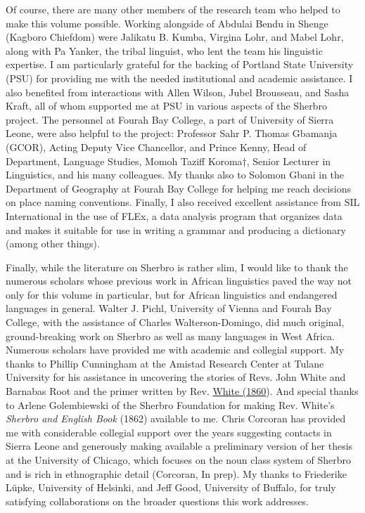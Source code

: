 Of course, there are many other members of the research team who helped to make this volume possible. Working alongside of Abdulai Bendu in Shenge (Kagboro Chiefdom) were Jalikatu B. Kumba, Virgina Lohr, and Mabel Lohr, along with Pa Yanker, the tribal linguist, who lent the team his linguistic expertise. I am particularly grateful for the backing of Portland State University (PSU) for providing me with the needed institutional and academic assistance. I also benefited from interactions with Allen Wilson, Jubel Brousseau, and Sasha Kraft, all of whom supported me at PSU in various aspects of the Sherbro project. The personnel at Fourah Bay College, a part of University of Sierra Leone, were also helpful to the project: Professor Sahr P. Thomas Gbamanja (GCOR), Acting Deputy Vice Chancellor, and Prince Kenny, Head of Department, Language Studies, Momoh Taziff Koroma†, Senior Lecturer in Linguistics, and his many colleagues. My thanks also to Solomon Gbani in the Department of Geography at Fourah Bay College for helping me reach decisions on place naming conventions. Finally, I also received excellent assistance from SIL International in the use of FLEx, a data analysis program that organizes data and makes it suitable for use in writing a grammar and producing a dictionary (among other things).

Finally, while the literature on Sherbro is rather slim, I would like to thank the numerous scholars whose previous work in African linguistics paved the way not only for this volume in particular, but for African linguistics and endangered languages in general. Walter J. Pichl, University of Vienna and Fourah Bay College, with the assistance of Charles Walterson-Domingo, did much original, ground-breaking work on Sherbro as well as many languages in West Africa. Numerous scholars have provided me with academic and collegial support. My thanks to Phillip Cunningham at the Amistad Research Center at Tulane University for his assistance in uncovering the stories of Revs. John White and Barnabas Root and the primer written by Rev. \hyperlink{ENREF92}{White (1860}). And special thanks to Arlene Golembiewski of the Sherbro Foundation for making Rev. White's \textit{Sherbro and English Book} (1862) available to me. Chris Corcoran has provided me with considerable collegial support over the years suggesting contacts in Sierra Leone and generously making available a preliminary version of her thesis at the University of Chicago, which focuses on the noun class system of Sherbro and is rich in ethnographic detail (Corcoran, In prep). My thanks to Friederike Lüpke, University of Helsinki, and Jeff Good, University of Buffalo, for truly satisfying collaborations on the broader questions this work addresses.


